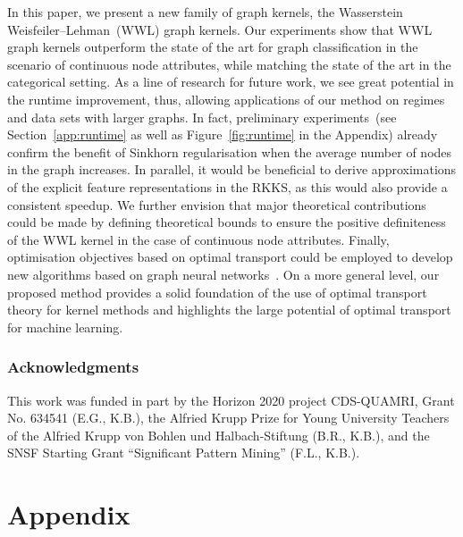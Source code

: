 \documentclass{article}
\begin{document}
In this paper, we present a new family of graph kernels, the Wasserstein Weisfeiler--Lehman~(WWL) graph kernels.
Our experiments show that WWL graph kernels outperform the state of the art for graph classification in the scenario of continuous node attributes, while matching the state of the art in the categorical setting.
As a line of research for future work, we see great potential in the runtime improvement, thus, allowing applications of our method on regimes and data sets with larger graphs. In fact, preliminary experiments~(see Section~\ref{app:runtime} as well as Figure~\ref{fig:runtime} in the Appendix) already confirm the benefit of Sinkhorn regularisation when the average number of nodes in the graph increases. In parallel, it would be beneficial to derive approximations of the explicit feature representations in the RKKS, as this would also provide a consistent speedup. We further envision that major theoretical contributions could be made by defining theoretical bounds to ensure the positive definiteness of the WWL kernel in the case of continuous node attributes.
Finally, optimisation objectives based on optimal transport could be employed to develop new algorithms based on graph neural networks~\citep{duvenaud2015convolutional, kipf2017semi}. On a more general level, our proposed method provides a solid foundation of the use of optimal transport theory for kernel methods and highlights the large potential of optimal transport for machine learning.


\subsubsection*{Acknowledgments}
\label{sec:acknowledgments}

This work was funded in part by the Horizon 2020 project CDS-QUAMRI, Grant No. 634541 (E.G., K.B.), the Alfried Krupp Prize for Young University Teachers of the Alfried Krupp von Bohlen und Halbach-Stiftung (B.R., K.B.), and the SNSF Starting Grant ``Significant Pattern
Mining'' (F.L., K.B.).






\clearpage
\appendix


\section{Appendix}\label{sec:Appendix}
\end{document}
